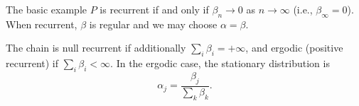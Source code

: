 The basic example $P$ is recurrent if and only if $\beta_n \to 0$ as $n \to \infty$ (i.e., $\beta_\infty = 0$). When recurrent, $\beta$ is regular and we may choose $\alpha = \beta$.

The chain is null recurrent if additionally $\sum_i \beta_i = +\infty$, and ergodic (positive recurrent) if $\sum_i \beta_i < \infty$. In the ergodic case, the stationary distribution is
$$\alpha_j = \frac{\beta_j}{\sum_k \beta_k}.$$

